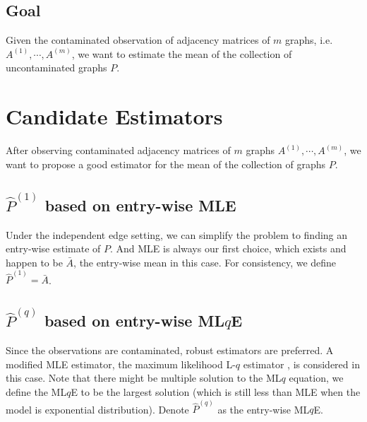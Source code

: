 \documentclass[a4paper]{article}
\begin{document}


\subsection{Goal}
Given the contaminated observation of adjacency matrices of $m$ graphs, i.e. $A^{(1)}, \cdots, A^{(m)}$, we want to estimate the mean of the collection of uncontaminated graphs $P$.










\section{Candidate Estimators}

After observing contaminated adjacency matrices of $m$ graphs $A^{(1)}, \cdots, A^{(m)}$, we want to propose a good estimator for the mean of the collection of graphs $P$.

\subsection{$\hat{P}^{(1)}$ based on entry-wise MLE}
Under the independent edge setting, we can simplify the problem to finding an entry-wise estimate of $P$. And MLE is always our first choice, which exists and happen to be $\bar{A}$, the entry-wise mean in this case. For consistency, we define $\hat{P}^{(1)} = \bar{A}$.


\subsection{$\hat{P}^{(q)}$ based on entry-wise ML$q$E}
Since the observations are contaminated, robust estimators are preferred. A modified MLE estimator, the maximum likelihood L-$q$ estimator \cite{ferrari2010, qin2013maximum}, is considered in this case. Note that there might be multiple solution to the ML$q$ equation, we define the ML$q$E to be the largest solution (which is still less than MLE when the model is exponential distribution). Denote $\hat{P}^{(q)}$ as the entry-wise ML$q$E.
\end{document}

